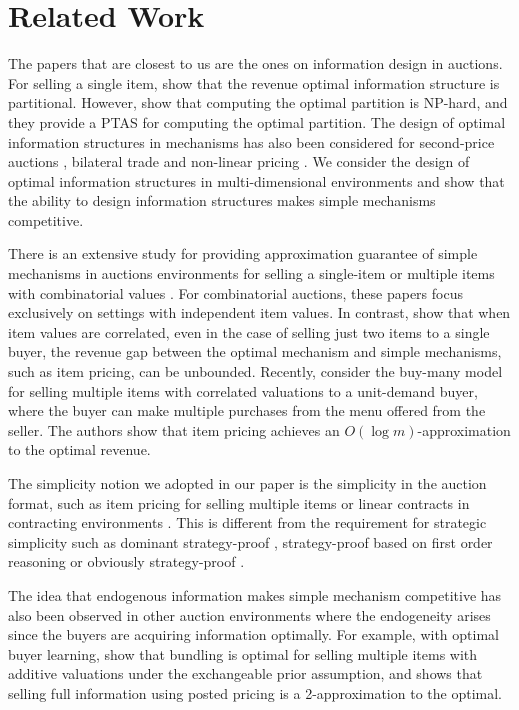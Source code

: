 \section{Related Work}
\label{sub:literature}
The papers that are closest to us are the ones on information design in auctions. 
For selling a single item, \citet{bergemann2007information} show that the revenue optimal information structure is partitional. 
However, \citet{cai2024algorithmic} show that computing the optimal partition is NP-hard, and they provide a PTAS for computing the optimal partition. 
The design of optimal information structures in mechanisms has also been considered for second-price auctions \citep{Bergemann2022Optimal}, bilateral trade \citep{schottmuller2023optimal}
and non-linear pricing \citep{bergemann2022screening}.
We consider the design of optimal information structures in multi-dimensional environments and show that the ability to design information structures makes simple mechanisms competitive. 

There is an extensive study for providing approximation guarantee of simple mechanisms in auctions environments for selling a single-item \citep[e.g.,][]{bulow1989simple,hartline2009simple,yan2011mechanism,alaei2019optimal,jin2019tight,feng2019optimal,beyhaghi2021improved,feng2023simple}
or multiple items with combinatorial values \citep[e.g.,][]{chawla2010multi,chawla2010power,babaioff2020simple,hart2017approximate,cai2016duality,cai_simple_2017,cai_computing_2022, cai_simultaneous_2023,daskalakis_multi-item_2022, babaioff2017menu}. 
For combinatorial auctions, these papers focus exclusively on settings with independent item values. In contrast, \citet{hart2019selling} show that when item values are correlated, even in the case of selling just two items to a single buyer, the revenue gap between the optimal mechanism and simple mechanisms, such as item pricing, can be unbounded.
Recently, \citet{chawla2019buy} consider the buy-many model for selling multiple items with correlated valuations to a unit-demand buyer, where the buyer can make multiple purchases from the menu offered from the seller. The authors show that item pricing achieves an $O(\log m)$-approximation to the optimal revenue. 

The simplicity notion we adopted in our paper is the simplicity in the auction format, such as item pricing for selling multiple items \citep{carroll2017robustness} or linear contracts in contracting environments \citep{carroll2015robustness}.
This is different from the requirement for strategic simplicity such as dominant strategy-proof \citep{chung2007foundations}, strategy-proof based on first order reasoning \citep{borgers2019strategically} or obviously strategy-proof \citep{li2017obviously}. 

The idea that endogenous information makes simple mechanism competitive has also been observed in other auction environments where the endogeneity arises since the buyers are acquiring information optimally. 
For example, with optimal buyer learning, \citet{deb2021multi} show that bundling is optimal for selling multiple items with additive valuations under the exchangeable prior assumption, 
and \citet{li2022selling} shows that selling full information using posted pricing is a 2-approximation to the optimal.